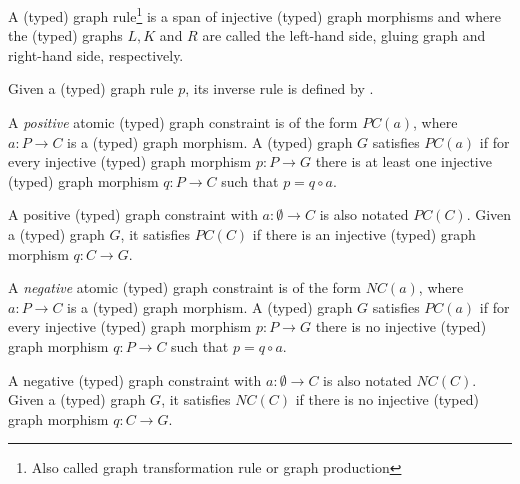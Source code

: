 \begin{definition} A (typed) graph rule\footnote{Also called graph transformation rule or graph production} \graphrule is a span of injective (typed) graph morphisms \lefthand and \righthand where the (typed) graphs $L, K$ and $R$ are called the left-hand side, gluing graph and right-hand side, respectively.

  Given a (typed) graph rule $p$, its inverse rule is defined by \inversegraphrule.
\end{definition}

\begin{definition} A \emph{positive} atomic (typed) graph constraint is of the form $PC(a)$, where $a : P \rightarrow C$ is a (typed) graph morphism. A (typed) graph $G$ satisfies $PC(a)$ if for every injective (typed) graph morphism $p : P \rightarrow G$ there is at least one injective (typed) graph morphism $q : P \rightarrow C$ such that $p = q \circ a$.

  A positive (typed) graph constraint with $a : \emptyset \rightarrow C$ is also notated $PC(C)$. Given a (typed) graph $G$, it satisfies $PC(C)$ if there is an injective (typed) graph morphism $q : C \rightarrow  G$.


\end{definition}

\begin{remark}
\end{remark}

\begin{definition}
A \emph{negative} atomic (typed) graph constraint is of the form $NC(a)$, where $a : P \rightarrow C$ is a (typed) graph morphism. A (typed) graph $G$ satisfies $PC(a)$ if for every injective (typed) graph morphism $p : P \rightarrow G$ there is no injective (typed) graph morphism $q : P \rightarrow C$ such that $p = q \circ a$.

  A negative (typed) graph constraint with $a : \emptyset \rightarrow C$ is also notated $NC(C)$. Given a (typed) graph $G$, it satisfies $NC(C)$ if there is no injective (typed) graph morphism $q : C \rightarrow G$.


\end{definition}

